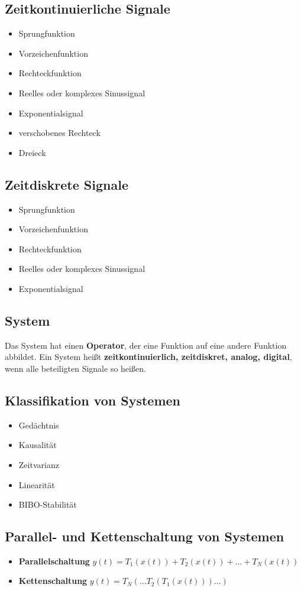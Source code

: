 \documentclass[10pt,a4paper]{article}
\begin{document}
	\subsection{Zeitkontinuierliche Signale}
	\begin{itemize}
	\item Sprungfunktion
	\item Vorzeichenfunktion
	\item Rechteckfunktion
	\item Reelles oder komplexes Sinussignal
	\item Exponentialsignal
	\item verschobenes Rechteck
	\item Dreieck
	\end{itemize}
	\subsection{Zeitdiskrete Signale}
	\begin{itemize}
	\item Sprungfunktion
	\item Vorzeichenfunktion
	\item Rechteckfunktion
	\item Reelles oder komplexes Sinussignal
	\item Exponentialsignal
	\end{itemize}
	\subsection{System}
	Das System hat einen \textbf{Operator}, der eine Funktion auf eine andere Funktion abbildet. Ein System heißt \textbf{zeitkontinuierlich, zeitdiskret, analog, digital}, wenn alle beteiligten Signale so heißen.
	\subsection{Klassifikation von Systemen}
	\begin{itemize}
	\item Gedächtnis
	\item Kausalität
	\item Zeitvarianz
	\item Linearität
	\item BIBO-Stabilität
	\end{itemize}
	\subsection{Parallel- und Kettenschaltung von Systemen}
	\begin{itemize}
	\item \textbf{Parallelschaltung} $y(t)=T_1(x(t))+T_2(x(t))+...+T_N(x(t))$
	\item \textbf{Kettenschaltung} 	$y(t)=T_N(...T_2(T_1(x(t)))...)$
	\end{itemize}
	\newpage
\end{document}
